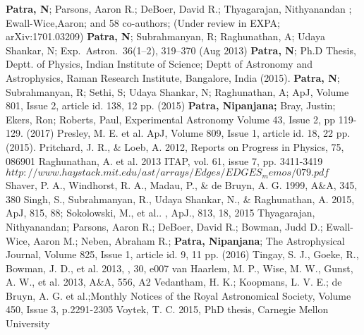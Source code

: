 \documentclass[12pt]{amsart}
\begin{document}
\begin{thebibliography}{}
\textbf{\color{blue} Patra, N}; Parsons, Aaron R.;  DeBoer, David R.; Thyagarajan, Nithyanandan ; Ewall-Wice,Aaron; and 58 co-authors; (Under review in EXPA;  arXiv:1701.03209)
\textbf{\color{blue}Patra, N}; Subrahmanyan, R; Raghunathan, A; Udaya Shankar, N; Exp.\ Astron.\ 36(1--2), 319--370 (Aug 2013)
\textbf{\color{blue}Patra, N}; Ph.D Thesis, Deptt. of Physics, Indian Institute of Science; Deptt of Astronomy and Astrophysics, Raman Research Institute, Bangalore, India (2015).
\textbf{\color{blue}Patra, N}; Subrahmanyan, R; Sethi, S; Udaya Shankar, N; Raghunathan, A; ApJ, Volume 801, Issue 2, article id. 138, 12 pp. (2015)
{\bf \color{blue}Patra, Nipanjana;}  Bray, Justin; Ekers, Ron; Roberts, Paul, Experimental Astronomy   Volume 43, Issue 2, pp 119-129. (2017)
Presley, M. E. et al. ApJ, Volume 809, Issue 1, article id. 18, 22 pp. (2015).
Pritchard, J. R., \& Loeb, A. 2012, Reports on Progress in
Physics, 75, 086901
Raghunathan, A. et al. 2013
ITAP, vol. 61, issue 7, pp. 3411-3419
$http://www.haystack.mit.edu/ast/arrays/Edges/EDGES_memos/079.pdf$
Shaver, P. A., Windhorst, R. A., Madau, P., \& de Bruyn, A. G.
1999, A\&A, 345, 380
Singh, S., Subrahmanyan, R., Udaya Shankar, N., \& Raghunathan, A. 2015,  ApJ, 815, 88;
Sokolowski, M., et al.. ,  ApJ., 813, 18, 2015
Thyagarajan, Nithyanandan; Parsons, Aaron R.; DeBoer, David R.; Bowman, Judd D.; Ewall-Wice, Aaron M.; Neben, Abraham R.; {\bf \color{blue}Patra, Nipanjana}; The Astrophysical Journal, Volume 825, Issue 1, article id. 9, 11 pp. (2016)
Tingay, S. J., Goeke, R., Bowman, J. D., et al. 2013, , 30, e007
van Haarlem, M. P., Wise, M. W., Gunst, A. W., et al. 2013,
A\&A, 556, A2
Vedantham, H. K.; Koopmans, L. V. E.; de Bruyn, A. G. et al.;Monthly Notices of the Royal Astronomical Society, Volume 450, Issue 3, p.2291-2305
Voytek, T. C. 2015, PhD thesis, Carnegie Mellon University




\end{thebibliography}
\end{document}
